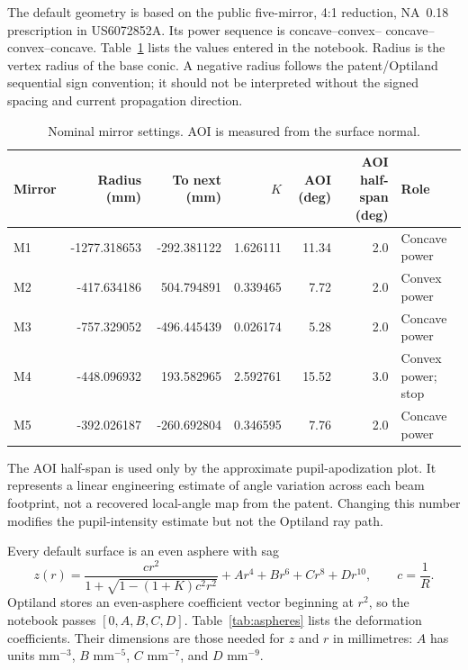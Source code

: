 \documentclass[11pt,a4paper]{article}
\begin{document}
The default geometry is based on the public five-mirror, 4:1 reduction,
NA~0.18 prescription in US6072852A.  Its power sequence is concave--convex--
concave--convex--concave.  Table~\ref{tab:mirrors} lists the values entered in
the notebook.  Radius is the vertex radius of the base conic.  A negative
radius follows the patent/Optiland sequential sign convention; it should not
be interpreted without the signed spacing and current propagation direction.

\begin{table}[H]
\centering
\caption{Nominal mirror settings. AOI is measured from the surface normal.}
\label{tab:mirrors}
\small
\begin{tabular}{@{}lrrrrrl@{}}
\toprule
Mirror & Radius (mm) & To next (mm) & $K$ & AOI (deg) & AOI half-span (deg) & Role \\
\midrule
M1 & -1277.318653 & -292.381122 & 1.626111 & 11.34 & 2.0 & Concave power \\
M2 &  -417.634186 &  504.794891 & 0.339465 &  7.72 & 2.0 & Convex power \\
M3 &  -757.329052 & -496.445439 & 0.026174 &  5.28 & 2.0 & Concave power \\
M4 &  -448.096932 &  193.582965 & 2.592761 & 15.52 & 3.0 & Convex power; stop \\
M5 &  -392.026187 & -260.692804 & 0.346595 &  7.76 & 2.0 & Concave power \\
\bottomrule
\end{tabular}
\end{table}

The AOI half-span is used only by the approximate pupil-apodization plot.  It
represents a linear engineering estimate of angle variation across each beam
footprint, not a recovered local-angle map from the patent.  Changing this
number modifies the pupil-intensity estimate but not the Optiland ray path.

Every default surface is an even asphere with sag
\begin{equation}
 z(r)=\frac{c r^2}{1+\sqrt{1-(1+K)c^2r^2}}
      +A r^4+B r^6+C r^8+D r^{10},
 \qquad c=\frac{1}{R}.
 \label{eq:sag}
\end{equation}
Optiland stores an even-asphere coefficient vector beginning at $r^2$, so the
notebook passes $[0,A,B,C,D]$.  Table~\ref{tab:aspheres} lists the deformation
coefficients.  Their dimensions are those needed for $z$ and $r$ in
millimetres: $A$ has units mm$^{-3}$, $B$ mm$^{-5}$, $C$ mm$^{-7}$, and $D$
mm$^{-9}$.
\end{document}
